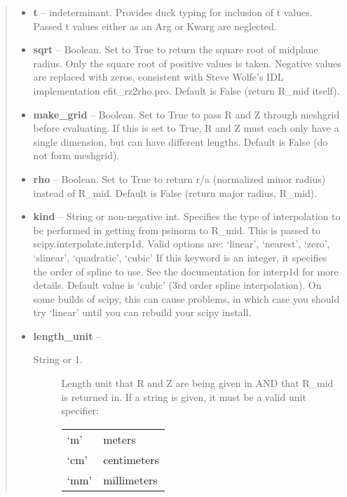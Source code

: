 \documentclass[letterpaper,10pt,english]{sphinxmanual}
\begin{document}
\begin{fulllineitems}
\begin{fulllineitems}
\begin{quote}
\begin{description}
\begin{itemize}
\item {} 
\textbf{t} -- indeterminant.
Provides duck typing for inclusion of t values. Passed t values
either as an Arg or Kwarg are neglected.

\item {} 
\textbf{sqrt} -- Boolean.
Set to True to return the square root of midplane
radius. Only the square root of positive values is taken.
Negative values are replaced with zeros, consistent with Steve
Wolfe's IDL implementation efit\_rz2rho.pro. Default is False
(return R\_mid itself).

\item {} 
\textbf{make\_grid} -- Boolean.
Set to True to pass R and Z through meshgrid
before evaluating. If this is set to True, R and Z must each
only have a single dimension, but can have different lengths.
Default is False (do not form meshgrid).

\item {} 
\textbf{rho} -- Boolean.
Set to True to return r/a (normalized minor radius)
instead of R\_mid. Default is False (return major radius, R\_mid).

\item {} 
\textbf{kind} -- String or non-negative int.
Specifies the type of interpolation
to be performed in getting from psinorm to R\_mid. This is
passed to scipy.interpolate.interp1d. Valid options are:
`linear', `nearest', `zero', `slinear', `quadratic', `cubic'
If this keyword is an integer, it specifies the order of spline
to use. See the documentation for interp1d for more details.
Default value is `cubic' (3rd order spline interpolation). On
some builds of scipy, this can cause problems, in which case
you should try `linear' until you can rebuild your scipy install.

\item {} 
\textbf{length\_unit} -- \begin{description}
\item[{String or 1.}] \leavevmode
Length unit that R and Z are being given
in AND that R\_mid is returned in. If a string is given, it
must be a valid unit specifier:

\begin{tabulary}{\linewidth}{|L|L|}
\hline

`m'
 & 
meters
\\

`cm'
 & 
centimeters
\\

`mm'
 & 
millimeters
\\


\end{tabulary}
\end{description}
\end{itemize}
\end{description}
\end{quote}
\end{fulllineitems}
\end{fulllineitems}
\end{document}

